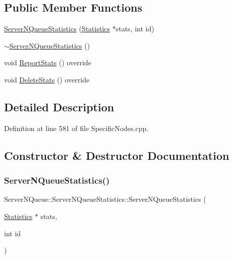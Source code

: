 \subsection*{Public Member Functions}
\begin{DoxyCompactItemize}
\item 
\hyperlink{class_server_n_queue_1_1_server_n_queue_statistics_afe1101a9301d90716165751ec1fe422d}{Server\+N\+Queue\+Statistics} (\hyperlink{class_generic_node_1_1_statistics}{Statistics} $\ast$stats, int id)
\item 
\hyperlink{class_server_n_queue_1_1_server_n_queue_statistics_af13ff99a897621817d5cd9399408cf2f}{$\sim$\+Server\+N\+Queue\+Statistics} ()
\item 
void \hyperlink{class_server_n_queue_1_1_server_n_queue_statistics_a65e23fedacbcba37a1033a690d7b10fd}{Report\+Stats} () override
\item 
void \hyperlink{class_server_n_queue_1_1_server_n_queue_statistics_ade4ec4cac903d382590362780a94b14d}{Delete\+Stats} () override
\end{DoxyCompactItemize}


\subsection{Detailed Description}


Definition at line 581 of file Specific\+Nodes.\+cpp.



\subsection{Constructor \& Destructor Documentation}
\mbox{\label{class_server_n_queue_1_1_server_n_queue_statistics_afe1101a9301d90716165751ec1fe422d}} 
\subsubsection{\texorpdfstring{Server\+N\+Queue\+Statistics()}{ServerNQueueStatistics()}}
{\footnotesize\ttfamily Server\+N\+Queue\+::\+Server\+N\+Queue\+Statistics\+::\+Server\+N\+Queue\+Statistics (\begin{DoxyParamCaption}\item[{\hyperlink{class_generic_node_1_1_statistics}{Statistics} $\ast$}]{stats,  }\item[{int}]{id }\end{DoxyParamCaption})\hspace{0.3cm}{\ttfamily [inline]}}



